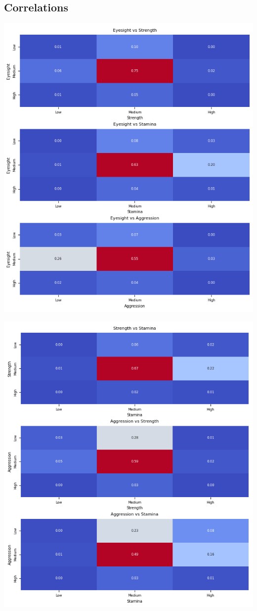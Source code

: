 \documentclass{article}
\begin{document}
\subsection{Correlations}
\begin{center}
    \includegraphics[scale=0.85]{images/Figure_01.png}
\end{center}
\begin{center}
    \includegraphics[scale=0.85]{images/Figure_02.png}
\end{center}
\end{document}
